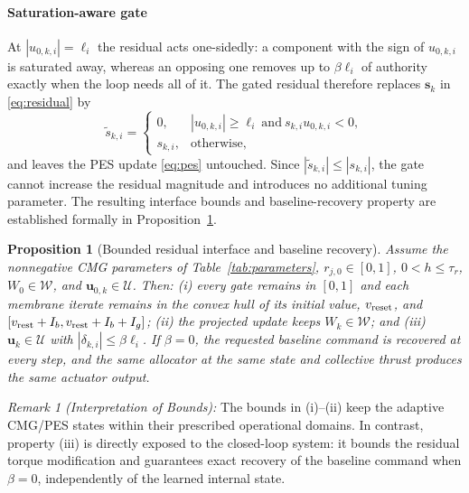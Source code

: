 \documentclass[letterpaper, 10 pt, conference]{ieeeconf}
\newtheorem{proposition}{Proposition}
\begin{document}
\paragraph{Saturation-aware gate}
At $|u_{0,k,i}|=\ell_i$ the residual acts one-sidedly: a component with the sign of $u_{0,k,i}$ is saturated away, whereas an opposing one removes up to $\beta\ell_i$ of authority exactly when the loop needs all of it. The gated residual therefore replaces $\bm s_k$ in \eqref{eq:residual} by
\begin{equation}
 \tilde s_{k,i}=\begin{cases}0,&|u_{0,k,i}|\ge\ell_i\ \text{and}\ s_{k,i}u_{0,k,i}<0,\\ s_{k,i},&\text{otherwise,}\end{cases}
 \label{eq:gate}
\end{equation}
and leaves the PES update \eqref{eq:pes} untouched. Since $|\tilde{s}_{k,i}| \le |s_{k,i}|$, the gate cannot increase
 the residual magnitude and introduces no additional tuning parameter.
 The resulting interface bounds and baseline-recovery property are
 established formally in Proposition~\ref{prop:bounded}.

\begin{proposition}[Bounded residual interface and baseline recovery]\label{prop:bounded}
Assume the nonnegative CMG parameters of Table~\ref{tab:parameters}, $r_{j,0}\in[0,1]$, $0<h\le\tau_r$, $W_0\in\mathcal W$, and $\bm u_{0,k}\in\mathcal U$. Then: (i) every gate remains in $[0,1]$ and each membrane iterate remains in the convex hull of its initial value, $v_{\rm reset}$, and $[v_{\rm rest}+I_b,v_{\rm rest}+I_b+I_g]$; (ii) the projected update keeps $W_k\in\mathcal W$; and (iii) $\bm u_k\in\mathcal U$ with $|\delta_{k,i}|\le\beta\ell_i$. If $\beta=0$, the requested baseline command is recovered at every step, and the same allocator at the same state and collective thrust produces the same actuator output.
\end{proposition}

\textit{Remark 1 (Interpretation of Bounds):}
The bounds in (i)--(ii) keep the adaptive CMG/PES states within their
prescribed operational domains. In contrast, property (iii) is directly
exposed to the closed-loop system: it bounds the residual torque
modification and guarantees exact recovery of the baseline command when
$\beta=0$, independently of the learned internal state.

\end{document}
